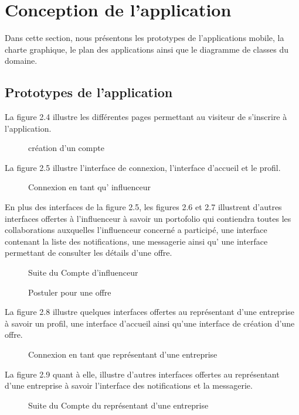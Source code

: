 

\newpage{}
\section{Conception de l'application}

    Dans cette section, nous présentons les prototypes de l'applications mobile, la charte graphique, le plan des applications ainsi que le diagramme de classes du domaine. 
 
    \subsection{Prototypes de l'application}
    

    La figure 2.4 illustre les différentes pages permettant au visiteur de s'inscrire à l'application.
\begin{figure}[h!]
      \centering
      \caption{création d'un compte}
    \end{figure}
\newline  La figure 2.5 illustre l'interface de connexion, l'interface d'accueil et le profil.  
\begin{figure}[h!]
      \centering
      \caption{Connexion en tant qu' influenceur}
    \end{figure}
   
    \newpage
     En plus des interfaces de la figure 2.5, les figures 2.6 et 2.7 illustrent d'autres interfaces offertes à l'influenceur à savoir un portofolio qui contiendra toutes les collaborations auxquelles l'influenceur concerné a participé, une interface contenant la liste des notifications, une messagerie ainsi qu' une interface permettant de consulter les détails d'une offre.
    \begin{figure}[h!]
      \centering
      \caption{Suite du Compte d'influenceur}
    \end{figure}
  \begin{figure}[h!]
      \centering
      \caption{Postuler pour une offre}
    \end{figure}
  
    \newpage
    La figure 2.8 illustre quelques interfaces offertes au représentant d'une entreprise à savoir un profil, une interface d'accueil ainsi qu'une interface de création d'une offre.
    
 \begin{figure}[h!]
      \centering
      \caption{Connexion en tant que représentant d'une entreprise}
    \end{figure}
    La figure 2.9 quant à elle, illustre d'autres interfaces offertes au représentant d'une entreprise à savoir l'interface des notifications et la messagerie. 
    \begin{figure}[h!]
      \centering
      \caption{Suite du Compte  du représentant d'une entreprise}
    \end{figure}

